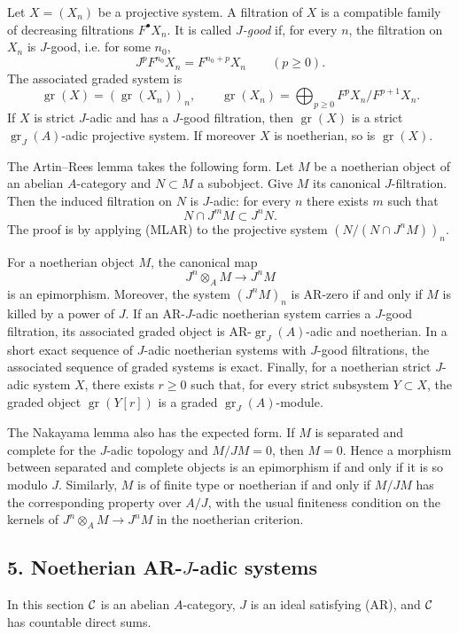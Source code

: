 \documentclass[11pt]{article}
\theoremstyle{plain}
\theoremstyle{definition}
\theoremstyle{remark}
\DeclareMathOperator{\gr}{gr}
\begin{document}
Let $X=(X_n)$ be a projective system. A filtration of $X$ is a compatible family of
decreasing filtrations $F^\bullet X_n$. It is called \emph{$J$-good} if, for every
$n$, the filtration on $X_n$ is $J$-good, i.e. for some $n_0$,
\[
       J^pF^{n_0}X_n=F^{n_0+p}X_n\qquad(p\ge0).
\]
The associated graded system is
\[
       \gr(X)=(\gr(X_n))_n,
       \qquad \gr(X_n)=\bigoplus_{p\ge0}F^pX_n/F^{p+1}X_n.
\]
If $X$ is strict $J$-adic and has a $J$-good filtration, then $\gr(X)$ is a strict
$\gr_J(A)$-adic projective system. If moreover $X$ is noetherian, so is
$\gr(X)$.

The Artin--Rees lemma takes the following form. Let $M$ be a noetherian object of
an abelian $A$-category and $N\subset M$ a subobject. Give $M$ its canonical
$J$-filtration. Then the induced filtration on $N$ is $J$-adic: for every $n$ there
exists $m$ such that
\[
        N\cap J^mM\subset J^nN.
\]
The proof is by applying (MLAR) to the projective system
$(N/(N\cap J^nM))_n$.

For a noetherian object $M$, the canonical map
\[
      J^n\otimes_A M\longrightarrow J^nM
\]
is an epimorphism. Moreover, the system $(J^nM)_n$ is AR-zero if and only if $M$
is killed by a power of $J$. If an AR-$J$-adic noetherian system carries a $J$-good
filtration, its associated graded object is AR-$\gr_J(A)$-adic and noetherian. In a
short exact sequence of $J$-adic noetherian systems with $J$-good filtrations, the
associated sequence of graded systems is exact. Finally, for a noetherian strict
$J$-adic system $X$, there exists $r\ge0$ such that, for every strict subsystem
$Y\subset X$, the graded object $\gr(Y[r])$ is a graded $\gr_J(A)$-module.

The Nakayama lemma also has the expected form. If $M$ is separated and complete for
the $J$-adic topology and $M/JM=0$, then $M=0$. Hence a morphism between separated
and complete objects is an epimorphism if and only if it is so modulo $J$. Similarly,
$M$ is of finite type or noetherian if and only if $M/JM$ has the corresponding
property over $A/J$, with the usual finiteness condition on the kernels of
$J^n\otimes_A M\to J^nM$ in the noetherian criterion.

\subsection*{5. Noetherian AR-$J$-adic systems}

In this section $\mathcal C$ is an abelian $A$-category, $J$ is an ideal satisfying (AR),
and $\mathcal C$ has countable direct sums.
\end{document}
